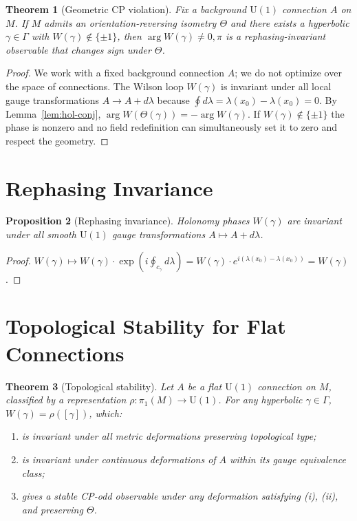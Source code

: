 ﻿\documentclass[12pt]{article}
\newtheorem{theorem}{Theorem}[section]
\newtheorem{proposition}[theorem]{Proposition}
\theoremstyle{definition}
\theoremstyle{remark}
\newcommand{\GammaG}{\Gamma}
\newcommand{\Uone}{\mathrm{U}(1)}
\newcommand{\pione}{\pi_1}
\begin{document}
\begin{theorem}[Geometric CP violation]\label{thm:CP}
Fix a background $\Uone$ connection $A$ on $M$. If $M$ admits an
orientation-reversing isometry $\Theta$ and there exists a hyperbolic
$\gamma\in\GammaG$ with $W(\gamma)\notin\{\pm1\}$, then
$\arg W(\gamma)\neq0,\pi$ is a rephasing-invariant observable that changes
sign under $\Theta$.
\end{theorem}

\begin{proof}
We work with a fixed background connection $A$; we do not optimize over
the space of connections. The Wilson loop $W(\gamma)$ is invariant under
all local gauge transformations $A\to A+d\lambda$ because
$\oint d\lambda=\lambda(x_0)-\lambda(x_0)=0$. By Lemma~\ref{lem:hol-conj},
$\arg W(\Theta(\gamma))=-\arg W(\gamma)$. If $W(\gamma)\notin\{\pm1\}$ the
phase is nonzero and no field redefinition can simultaneously set it to zero
and respect the geometry.
\end{proof}

\section{Rephasing Invariance}

\begin{proposition}[Rephasing invariance]\label{prop:rephasing}
Holonomy phases $W(\gamma)$ are invariant under all smooth $\Uone$ gauge
transformations $A\mapsto A+d\lambda$.
\end{proposition}

\begin{proof}
$W(\gamma)\mapsto W(\gamma)\cdot\exp(i\oint_{c_\gamma}d\lambda)
=W(\gamma)\cdot e^{i(\lambda(x_0)-\lambda(x_0))}=W(\gamma)$.
\end{proof}

\section{Topological Stability for Flat Connections}

\begin{theorem}[Topological stability]\label{thm:stability}
Let $A$ be a flat $\Uone$ connection on $M$, classified by a representation
$\rho\colon\pione(M)\to\Uone$. For any hyperbolic $\gamma\in\GammaG$,
$W(\gamma)=\rho([\gamma])$, which:
\begin{enumerate}
\item[\emph{(i)}] is invariant under all metric deformations preserving
topological type;
\item[\emph{(ii)}] is invariant under continuous deformations of $A$ within
its gauge equivalence class;
\item[\emph{(iii)}] gives a stable CP-odd observable under any deformation
satisfying \emph{(i)}, \emph{(ii)}, and preserving $\Theta$.
\end{enumerate}
\end{theorem}
\end{document}

